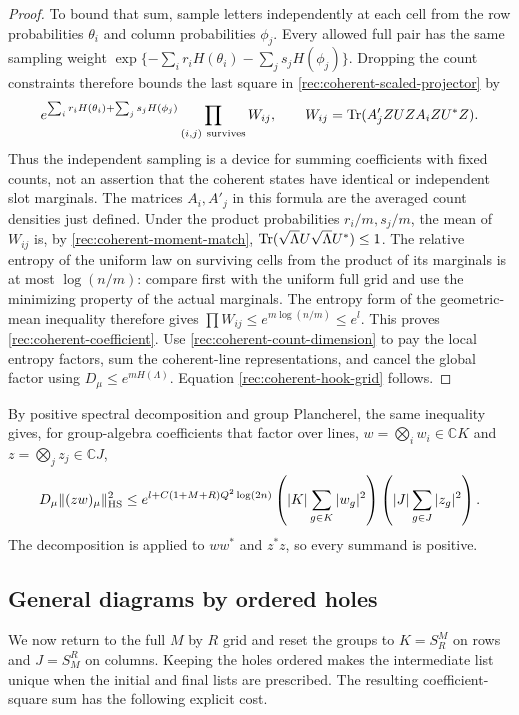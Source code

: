 \begin{proof}
To bound that sum, sample letters independently at each cell from the row probabilities $\theta_i$ and column probabilities $\phi_j$. Every allowed full pair has the same sampling weight
$\exp\{-\sum_ir_iH(\theta_i)-\sum_js_jH(\phi_j)\}$.
Dropping the count constraints therefore bounds the last square in \eqref{rec:coherent-scaled-projector} by
\[
 e^{\sum_ir_iH(\theta_i)+\sum_js_jH(\phi_j)}
       \prod_{(i,j)\ \mathrm{survives}}W_{ij},\qquad
 W_{ij}=\operatorname{Tr}(A'_jZUZ A_iZU^*Z).
\]
Thus the independent sampling is a device for summing coefficients with fixed counts, not an assertion that the coherent states have identical or independent slot marginals. The matrices $A_i,A'_j$ in this formula are the averaged count densities just defined.
Under the product probabilities $r_i/m,s_j/m$, the mean of $W_{ij}$
is, by \eqref{rec:coherent-moment-match},
$\operatorname{Tr}(\sqrt\Lambda U\sqrt\Lambda U^*)\le1$.
The relative entropy of the uniform law on surviving cells from
the product of its marginals is at most $\log(n/m)$: compare first
with the uniform full grid and use the minimizing property of the
actual marginals.  The entropy form of the geometric-mean inequality
therefore gives
$\prod W_{ij}\le e^{m\log(n/m)}\le e^l$.
This proves \eqref{rec:coherent-coefficient}.
Use \eqref{rec:coherent-count-dimension} to pay the local entropy
factors, sum the coherent-line representations, and cancel the
global factor using $D_\mu\le e^{mH(\Lambda)}$.
Equation \eqref{rec:coherent-hook-grid} follows.
\end{proof}

By positive spectral decomposition and group Plancherel, the same
inequality gives, for group-algebra coefficients that factor over lines, $w=\bigotimes_i w_i\in\mathbb C K$ and $z=\bigotimes_j z_j\in\mathbb C J$,
\begin{equation}\label{rec:coherent-coefficient-grid}
 D_\mu\|(zw)_\mu\|_{\mathrm{HS}}^2
 \le e^{l+C(1+M+R)Q^2\log(2n)}
 \left(|K|\sum_{g\in K}|w_g|^2\right)
 \left(|J|\sum_{g\in J}|z_g|^2\right).
\end{equation}
The decomposition is applied to $ww^*$ and $z^*z$, so every summand
is positive.

\subsection{General diagrams by ordered holes}

We now return to the full $M$ by $R$ grid and reset the groups to
$K=S_R^M$ on rows and $J=S_M^R$ on columns.  Keeping the holes
ordered makes the intermediate list unique when the initial and
final lists are prescribed.  The resulting coefficient-square sum
has the following explicit cost.


